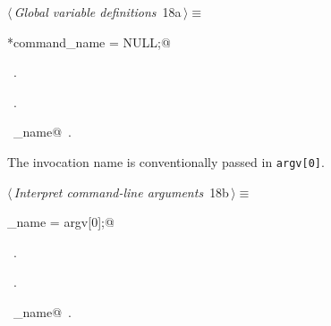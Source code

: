 \documentclass[a4paper]{report}
\begin{document}
\begin{flushleft} \small
\begin{minipage}{\linewidth}\label{scrap22}\raggedright\small
{} $\langle\,${\it Global variable definitions}\nobreak\ {\footnotesize {18a}}$\,\rangle\equiv$
\vspace{-1ex}
\begin{list}{}{} \item
\mbox{}\verb@char *command_name = NULL;@\\
\mbox{}\verb@@{\NWsep}
\end{list}
\vspace{-1.5ex}
\footnotesize
\begin{list}{}{\setlength{\itemsep}{-\parsep}\setlength{\itemindent}{-\leftmargin}}
\item \NWtxtMacroDefBy\ .
\item \NWtxtMacroRefIn\ .
\item \NWtxtIdentsUsed\nobreak\  \verb@command_name@\nobreak\ .
\item{}
\end{list}
\end{minipage}\vspace{4ex}
\end{flushleft}
The invocation name is conventionally passed in \verb|argv[0]|.
\begin{flushleft} \small
\begin{minipage}{\linewidth}\label{scrap23}\raggedright\small
{} $\langle\,${\it Interpret command-line arguments}\nobreak\ {\footnotesize {18b}}$\,\rangle\equiv$
\vspace{-1ex}
\begin{list}{}{} \item
\mbox{}\verb@command_name = argv[0];@\\
\mbox{}\verb@@{\NWsep}
\end{list}
\vspace{-1.5ex}
\footnotesize
\begin{list}{}{\setlength{\itemsep}{-\parsep}\setlength{\itemindent}{-\leftmargin}}
\item \NWtxtMacroDefBy\ .
\item \NWtxtMacroRefIn\ .
\item \NWtxtIdentsUsed\nobreak\  \verb@command_name@\nobreak\ .
\item{}
\end{list}
\end{minipage}\vspace{4ex}
\end{flushleft}
\end{document}
